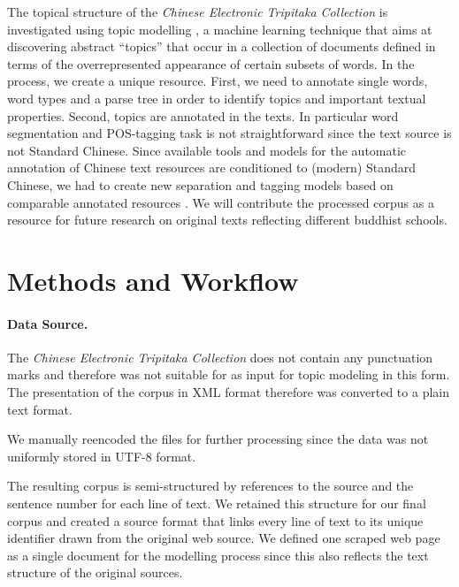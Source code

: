 \documentclass[a4paper,10pt]{article}
\newcommand{\TODO}[1]{\begingroup\color{red}#1\endgroup}
\newcommand{\NR}[1]{\begingroup\color{orange}#1\endgroup}
\begin{document}
The topical structure of the \textit{Chinese Electronic Tripitaka Collection} is investigated using topic
modelling \cite{blei2012probabilistic}, a machine learning technique that
aims at discovering abstract ``topics'' that occur in a collection of
documents defined in terms of the overrepresented appearance of certain
subsets of words. In the process, we create a unique resource. First, we
need to annotate single words, word types and a parse tree in order to
identify topics and important textual properties. Second, topics are
annotated in the texts.  In particular word segmentation and POS-tagging
task is not straightforward since the text source is not Standard
Chinese. Since available tools and models for the automatic annotation of
Chinese text resources are conditioned to \NR{(modern)} Standard Chinese,
we had to create new separation and tagging models based on comparable
annotated resources \cite{Wong:16}.  We will contribute the processed corpus
as a resource for future research on original texts reflecting different
buddhist schools.

\section{Methods and Workflow} 

\paragraph{Data Source.} The \textit{Chinese Electronic Tripitaka Collection} 
\cite{} does not contain any
  punctuation marks and therefore was not suitable for as input for topic
  modeling in this form. The presentation of the corpus in XML format 
  \cite{CBETA:16}  therefore was converted to a plain text format.
  
  We manually reencoded the files for further processing \NR{since the data
  was not uniformly stored in UTF-8 format}.

  The resulting corpus is semi-structured by references to the source and
  the sentence number for each line of text. We retained this structure for
  our final corpus and created a source format that links every line of
  text to its unique identifier drawn from the original web source. We
  defined one scraped web page as a single document for the modelling
  process since this also reflects the text structure of the original
  sources.
    
\end{document}
